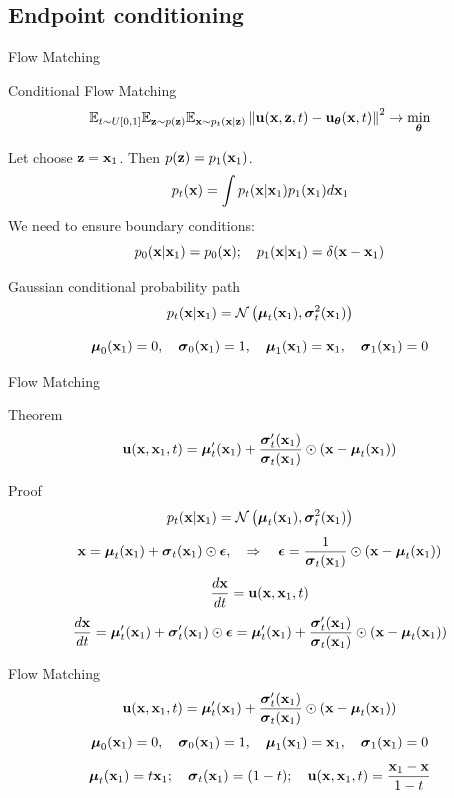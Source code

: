 \subsection{Endpoint conditioning}
\begin{frame}{Flow Matching}
	\begin{block}{Conditional Flow Matching}
		\vspace{-0.3cm}
		\[
			\bbE_{t \sim U[0, 1]} \bbE_{\bz \sim p(\bz)} \bbE_{\bx \sim p_t(\bx | \bz)}\left\| \bu(\bx, \bz, t) - \bu_{\btheta}(\bx, t) \right\|^2 \rightarrow \min_{\btheta}
		\]
	\end{block}
	Let choose $\bz = \bx_1$. Then $p(\bz) = p_1(\bx_1)$.
	\[
		p_t(\bx) = \int p_t(\bx | \bx_1) p_1(\bx_1) d \bx_1
	\]
	We need to ensure boundary conditions:
	\[
		p_0(\bx | \bx_1) = p_0(\bx); \quad p_1(\bx | \bx_1) = \delta(\bx - \bx_1)
	\]
	\vspace{-0.3cm}
	\begin{block}{Gaussian conditional probability path}
		\[
			p_t(\bx | \bx_1) = \cN\left(\bmu_t(\bx_1), \bsigma_t^2(\bx_1)\right)
		\]
		\vspace{-0.6cm}
	\end{block}
	\[
		\bmu_0(\bx_1) = 0, \quad \bsigma_0(\bx_1) = 1, \quad \bmu_1(\bx_1) = \bx_1, \quad \bsigma_1(\bx_1) = 0
	\]
\end{frame}
\begin{frame}{Flow Matching}
	\begin{block}{Theorem}
		\[
			\bu(\bx, \bx_1, t) =  \bmu_t'(\bx_1) + \frac{\bsigma_t'(\bx_1)}{\bsigma_t(\bx_1)} \odot (\bx - \bmu_t(\bx_1))
		\]
	\end{block}
	\begin{block}{Proof}
	\[
		p_t(\bx | \bx_1) = \cN\left(\bmu_t(\bx_1), \bsigma_t^2(\bx_1)\right)
	\]
	\[
		\bx = \bmu_t(\bx_1) + \bsigma_t(\bx_1) \odot \bepsilon, \quad \Rightarrow \quad \bepsilon = \frac{1}{\bsigma_t(\bx_1)} \odot (\bx - \bmu_t(\bx_1))
	\]
	\[
		 \frac{d\bx}{dt} = \bu(\bx, \bx_1, t)
	\]
	\[
		\frac{d\bx}{dt} = \bmu_t'(\bx_1) + \bsigma_t'(\bx_1) \odot \bepsilon =  \bmu_t'(\bx_1) + \frac{\bsigma_t'(\bx_1)}{\bsigma_t(\bx_1)} \odot (\bx - \bmu_t(\bx_1))
	\]
	\end{block}
\end{frame}
\begin{frame}{Flow Matching}
	\[
		\bu(\bx, \bx_1, t) =  \bmu_t'(\bx_1) + \frac{\bsigma_t'(\bx_1)}{\bsigma_t(\bx_1)} \odot (\bx - \bmu_t(\bx_1))
	\]
	\[
		\bmu_0(\bx_1) = 0, \quad \bsigma_0(\bx_1) = 1, \quad \bmu_1(\bx_1) = \bx_1, \quad \bsigma_1(\bx_1) = 0
	\]
	\[
		\bmu_t(\bx_1) = t \bx_1; \quad \bsigma_t(\bx_1) = (1 - t); \quad \bu(\bx, \bx_1, t) = \frac{\bx_1  - \bx}{1-t}
	\]
\end{frame}
